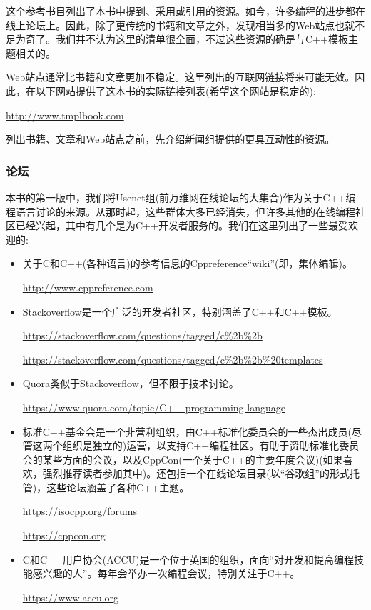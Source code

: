 
这个参考书目列出了本书中提到、采用或引用的资源。如今，许多编程的进步都在线上论坛上。因此，除了更传统的书籍和文章之外，发现相当多的Web站点也就不足为奇了。我们并不认为这里的清单很全面，不过这些资源的确是与C++模板主题相关的。

Web站点通常比书籍和文章更加不稳定。这里列出的互联网链接将来可能无效。因此，在以下网站提供了这本书的实际链接列表(希望这个网站是稳定的):

\url{http://www.tmplbook.com}

列出书籍、文章和Web站点之前，先介绍新闻组提供的更具互动性的资源。

\subsubsection*{论坛}

本书的第一版中，我们将Usenet组(前万维网在线论坛的大集合)作为关于C++编程语言讨论的来源。从那时起，这些群体大多已经消失，但许多其他的在线编程社区已经兴起，其中有几个是为C++开发者服务的。我们在这里列出了一些最受欢迎的:

\begin{itemize}
\item 
关于C和C++(各种语言)的参考信息的Cppreference“wiki”(即，集体编辑)。

\url{http://www.cppreference.com}

\item
Stackoverflow是一个广泛的开发者社区，特别涵盖了C++和C++模板。

\url{https://stackoverflow.com/questions/tagged/c%2b%2b}

\url{https://stackoverflow.com/questions/tagged/c%2b%2b%20templates}

\item
Quora类似于Stackoverflow，但不限于技术讨论。

\url{https://www.quora.com/topic/C++-programming-language}

\item
标准C++基金会是一个非营利组织，由C++标准化委员会的一些杰出成员(尽管这两个组织是独立的)运营，以支持C++编程社区。有助于资助标准化委员会的某些方面的会议，以及CppCon(一个关于C++的主要年度会议)(如果喜欢，强烈推荐读者参加其中)。还包括一个在线论坛目录(以“谷歌组”的形式托管)，这些论坛涵盖了各种C++主题。

\url{https://isocpp.org/forums}

\url{https://cppcon.org}

\item
C和C++用户协会(ACCU)是一个位于英国的组织，面向“对开发和提高编程技能感兴趣的人”。每年会举办一次编程会议，特别关注于C++。

\url{https://www.accu.org}
\end{itemize}

